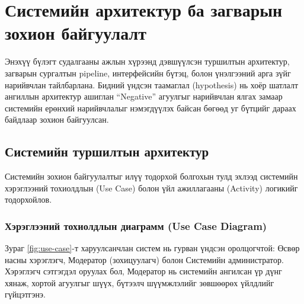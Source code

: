 
\chapter{Системийн архитектур ба загварын зохион байгуулалт}
\label{Chapter3}

Энэхүү бүлэгт судалгааны ажлын хүрээнд дэвшүүлсэн туршилтын архитектур, загварын
сургалтын pipeline, интерфейсийн бүтэц, болон үнэлгээний арга зүйг нарийвчлан
тайлбарлана. Бидний үндсэн таамаглал (hypothesis) нь хоёр шатлалт ангиллын
архитектур ашиглан ``Negative'' агуулгыг нарийвчлан ялгах замаар системийн
ерөнхий нарийвчлалыг нэмэгдүүлэх байсан бөгөөд уг бүтцийг дараах байдлаар
зохион байгуулсан.

\section{Системийн туршилтын архитектур}

Системийн зохион байгуулалтыг илүү тодорхой болгохын тулд эхлээд системийн
хэрэглээний тохиолдлын (Use Case) болон үйл ажиллагааны (Activity) логикийг
тодорхойлов.

\subsection{Хэрэглээний тохиолдлын диаграмм (Use Case Diagram)}

Зураг \ref{fig:use-case}-т харуулсанчлан систем нь гурван үндсэн оролцогчтой:
Өсвөр насны хэрэглэгч, Модератор (зохицуулагч) болон Системийн администратор.
Хэрэглэгч сэтгэгдэл оруулах бол, Модератор нь системийн ангилсан үр дүнг хянаж,
хортой агуулгыг шүүх, бүтээлч шүүмжлэлийг зөвшөөрөх үйлдлийг гүйцэтгэнэ.

